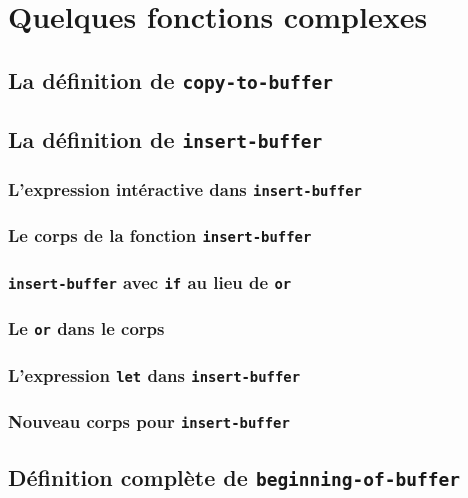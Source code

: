 \chapter{Quelques fonctions complexes}

\section{La définition de \texttt{copy-to-buffer}}

\section{La définition de \texttt{insert-buffer}}

\subsection{L'expression intéractive dans
  \texttt{insert-buffer}} 

\subsection{Le corps de la fonction
  \texttt{insert-buffer}}

\subsection{\texttt{insert-buffer} avec \texttt{if} au lieu de
  \texttt{or}} 

\subsection{Le \texttt{or} dans le corps}

\subsection{L'expression \texttt{let} dans
  \texttt{insert-buffer}} 

\subsection{Nouveau corps pour \texttt{insert-buffer}}

\section{Définition complète de
  \texttt{beginning-of-buffer}}

